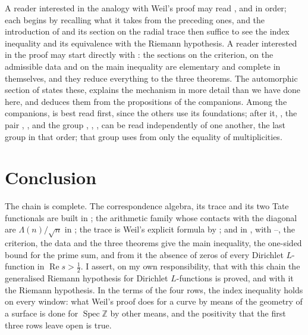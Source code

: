 \documentclass[10pt]{amsart}
\theoremstyle{definition}
\theoremstyle{remark}
\newcommand{\Z}{\mathbb Z}
\newcommand{\Rel}{\operatorname{Re}}
\begin{document}
A reader interested in the analogy with Weil's proof may read \cite{P43}, \cite{P44} and
\cite{Paper45} in order; each begins by recalling what it takes from the preceding ones, and the
introduction of \cite{P46} and its section on the radial trace then suffice to see the index
inequality and its equivalence with the Riemann hypothesis. A reader interested in the proof
may start directly with \cite{P46}: the sections on the criterion, on the admissible data and
on the main inequality are elementary and complete in themselves, and they reduce everything to
the three theorems. The automorphic section of \cite{P46} states these, explains the mechanism
in more detail than we have done here, and deduces them from the propositions of the
companions. Among the companions, \cite{P49} is best read first, since the others use its
foundations; after it, \cite{P50}, the pair \cite{P51}, \cite{P52}, and the group
\cite{P53}, \cite{P54}, \cite{P55}, \cite{P56} can be read independently of one another, the
last group in that order; that group uses from \cite{P51} only the equality of multiplicities.

\section{Conclusion}\label{sec:conclusion}
The chain is complete. The correspondence algebra, its trace and its two Tate functionals are
built in \cite{P43}; the arithmetic family whose contacts with the diagonal are
$\Lambda(n)/\sqrt n$ in \cite{P44}; the trace is Weil's explicit formula by \cite{Paper45}; and
in \cite{P46}, with \cite{P49}--\cite{P56}, the criterion, the data and the three theorems
give the main inequality, the one-sided bound for the prime sum, and from it the absence of
zeros of every Dirichlet $L$-function in $\Rel s>\tfrac12$. I assert, on my own responsibility,
that with this chain the generalised Riemann hypothesis for Dirichlet $L$-functions is proved,
and with it the Riemann hypothesis. In the terms of the four rows, the index inequality holds
on every window: what Weil's proof does for a curve by means of the geometry of a surface is
done for $\operatorname{Spec}\Z$ by other means, and the positivity that the first three rows
leave open is true.
\end{document}
